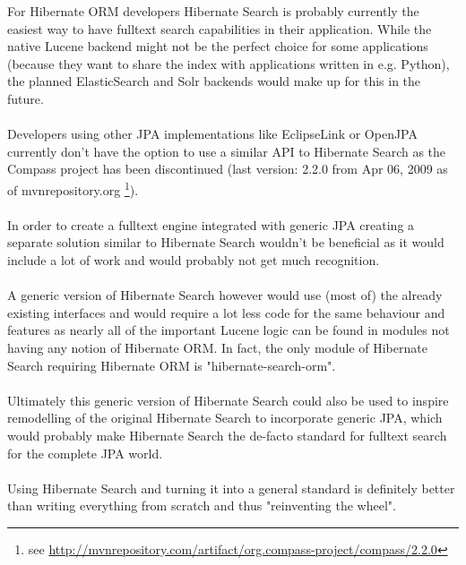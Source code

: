 For Hibernate ORM developers Hibernate Search is probably currently the easiest way to have fulltext search capabilities in their application. While the native Lucene backend might not be the perfect choice for some applications (because they want to share the index with applications written in e.g. Python), the planned ElasticSearch and Solr backends would make up for this in the future.
\\\\
Developers using other JPA implementations like EclipseLink or OpenJPA currently don't have the option to use a similar API to Hibernate Search as the Compass project has been discontinued (last version: 2.2.0 from Apr 06, 2009 as of mvnrepository.org \footnote{see \url{http://mvnrepository.com/artifact/org.compass-project/compass/2.2.0}}).
\\\\
In order to create a fulltext engine integrated with generic JPA creating a separate solution similar to Hibernate Search wouldn't be beneficial as it would include a lot of work and would probably not get much recognition.
\\\\
A generic version of Hibernate Search however would use (most of) the already existing interfaces and would require a lot less code for the same behaviour and features as nearly all of the important Lucene logic can be found in modules not having any notion of Hibernate ORM. In fact, the only module of Hibernate Search requiring Hibernate ORM is "hibernate-search-orm".
\\\\
Ultimately this generic version of Hibernate Search could also be used to inspire remodelling of the original Hibernate Search to incorporate generic JPA, which would probably make Hibernate Search the de-facto standard for fulltext search for the complete JPA world.
\\\\
Using Hibernate Search and turning it into a general standard is definitely better than writing everything from scratch and thus "reinventing the wheel". \label{reinvent_the_wheel}

\pagebreak